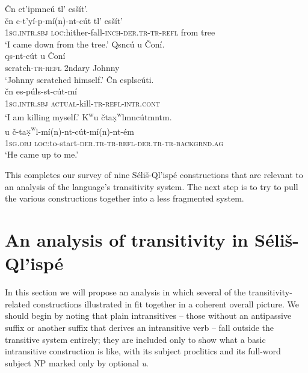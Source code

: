 \documentclass[output=paper,colorlinks,citecolor=brown]{langscibook}
\begin{document}
\ea 
\label{ex-thomason-41}
\v{C}n ct'ipmnc\'u tl' es\v{s}\'it'.  \\
\gll \v{c}n c-t'y\'i-p-m\'i(n)-nt-c\'ut tl' es\v{s}\'it' \\
\textsc{1sg}.\textsc{intr.sbj} \textsc{loc}:hither-fall-\textsc{inch-der.tr-tr-refl} from tree \\
\glt `I came down from the tree.'
\ex 
\label{ex-thomason-42}
Qsnc\'u {\textltilde}u \v{C}on\'i. \\
\gll qs-nt-c\'ut {\textltilde}u \v{C}on\'i \\ 
scratch-\textsc{tr-refl} 2ndary Johnny \\
\glt `Johnny scratched himself.'
\ex 
\label{ex-thomason-43}
\v{C}n esplsc\'uti. \\
\gll \v{c}n es-p\'uls-st-c\'ut-m\'i \\
\textsc{1sg}.\textsc{intr.sbj} \textsc{actual}-kill-\textsc{tr-refl-intr.cont} \\
\glt  `I am killing myself.'
\ex 
\label{ex-thomason-44}
{K\textsuperscript w}u \v{c}ta{\d{x}\textsuperscript w}lmnc\'utmntm. \\
u \v{c}-ta{\d{x}\textsuperscript
 w}l-m\'i(n)-nt-c\'ut-m\'i(n)-nt-\'em \\ 
\textsc{1sg}.\textsc{obj} \textsc{loc}:to-start-\textsc{der.tr-tr-refl-der.tr-tr-backgrnd.ag} \\
\glt `He came up to me.'
\z


This completes our survey of nine S\'eli\v{s}-Ql'isp\'e constructions
that are relevant to an analysis of the language's transitivity
system.  The next step is to try to pull the various constructions
together into a less fragmented system.

\section{An analysis of transitivity in S\'eli\v{s}-Ql'isp\'e}  %
\label{thomason_section_3}\largerpage[2]

In this section we will propose an analysis in which several of the
transitivity-related constructions illustrated in
 fit
together in a coherent overall picture.  We should begin by noting
that plain intransitives -- those without an antipassive suffix or
another suffix that derives an intransitive verb -- fall outside the
transitive system entirely; they are included only to show what a
basic intransitive construction is like, with its subject proclitics
and its full-word subject NP marked only by optional \emph{{\textltilde}u}.
\end{document}
